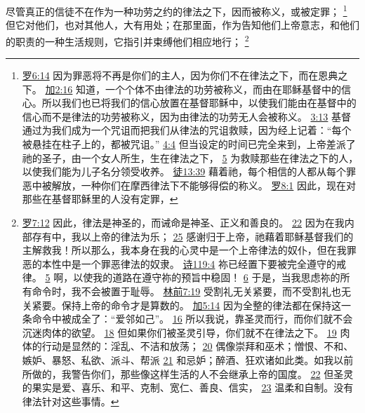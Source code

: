 \documentclass[12pt, a4paper, oneside]{ctexart}
\newcounter{parnum}[section]
\newcommand{\N}{%
   \noindent\refstepcounter{parnum}%
    \makebox[\parindent][l]{\textbf{\arabic{parnum}.}}}
\begin{document}
\N 尽管真正的信徒不在作为一种功劳之约的律法之下，因而被称义，或被定罪；
	\footnote {
		\href{https://biblehub.com/romans/6-14.htm}{罗6:14} 因为罪恶将不再是你们的主人，因为你们不在律法之下，而在恩典之下。
		\href{https://biblehub.com/galatians/2-16.htm}{加2:16} 知道，一个个体不由律法的功劳被称义，而由在耶稣基督中的信心。所以我们也已将我们的信心放置在基督耶稣中，以使我们能由在基督中的信心而不是律法的功劳被称义，因为由律法的功劳无人会被称义。
		\href{https://biblehub.com/galatians/3-13.htm}{3:13} 基督通过为我们成为一个咒诅而把我们从律法的咒诅救赎，因为经上记着：“每个被悬挂在柱子上的，都被咒诅。”
		\href{https://biblehub.com/galatians/4-4.htm}{4:4} 但当设定的时间已完全来到，上帝差派了祂的圣子，由一个女人所生，生在律法之下，
		\href{https://biblehub.com/galatians/4-5.htm}{5} 为救赎那些在律法之下的人，以使我们能为儿子名分领受收养。
        \href{https://biblehub.com/acts/13-39.htm}{徒13:39} 藉着祂，每个相信的人都从每个罪恶中被解放，一种你们在摩西律法下不能够得偿的称义。
		\href{https://biblehub.com/romans/8-1.htm}{罗8:1} 因此，现在对那些在基督耶稣里的人没有定罪，
	}
	但它对他们，也对其他人，大有用处；在那里面，作为告知他们上帝意志，和他们的职责的一种生活规则，它指引并束缚他们相应地行；
	\footnote {
		\href{https://biblehub.com/romans/7-12.htm}{罗7:12} 因此，律法是神圣的，而诫命是神圣、正义和善良的。
        \href{https://biblehub.com/romans/7-22.htm}{22} 因为在我内部存有中，我以上帝的律法为乐；
		\href{https://biblehub.com/romans/7-25.htm}{25} 感谢归于上帝，祂藉着耶稣基督我们的主解救我！所以那么，我本身在我的心灵中是一个上帝律法的奴仆，但在我罪恶的本性中是一个罪恶律法的奴隶。
		\href{https://biblehub.com/psalms/119-4.htm}{诗119:4} 祢已经置下要被完全遵守的戒律。
		\href{https://biblehub.com/psalms/119-5.htm}{5} 啊，以使我的道路在遵守祢的预旨中稳固！
		\href{https://biblehub.com/psalms/119-6.htm}{6} 于是，当我思虑祢的所有命令时，我不会被置于耻辱。
		\href{https://biblehub.com/1_corinthians/7-19.htm}{林前7:19} 受割礼无关紧要，而不受割礼也无关紧要。保持上帝的命令才是算数的。
		\href{https://biblehub.com/galatians/5-14.htm}{加5:14} 因为全整的律法都在保持这一条命令中被成全了：“爱邻如己”。
		\href{https://biblehub.com/galatians/5-16.htm}{16} 所以我说，靠圣灵而行，而你们就不会沉迷肉体的欲望。
		\href{https://biblehub.com/galatians/5-18.htm}{18} 但如果你们被圣灵引导，你们就不在律法之下。
		\href{https://biblehub.com/galatians/5-19.htm}{19} 肉体的行动是显然的：淫乱、不洁和放荡；
		\href{https://biblehub.com/galatians/5-20.htm}{20} 偶像崇拜和巫术；憎恨、不和、嫉妒、暴怒、私欲、派斗、帮派
		\href{https://biblehub.com/galatians/5-21.htm}{21} 和忌妒；醉酒、狂欢诸如此类。如我以前所做的，我警告你们，那些像这样生活的人不会继承上帝的国度。
		\href{https://biblehub.com/galatians/5-22.htm}{22} 但圣灵的果实是爱、喜乐、和平、克制、宽仁、善良、信实，
		\href{https://biblehub.com/galatians/5-23.htm}{23} 温柔和自制。没有律法针对这些事情。
	}
\end{document}
